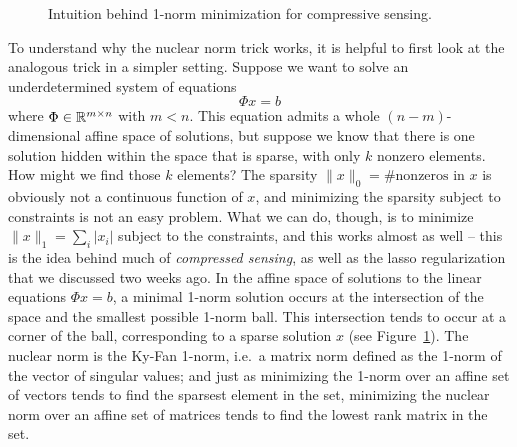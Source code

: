 \documentclass[12pt, leqno]{article} %
\begin{document}
\begin{figure}
  \begin{center}
  \end{center}
  \caption{Intuition behind 1-norm minimization for compressive
    sensing.}
  \label{fig:cs}
\end{figure}

To understand why the nuclear norm trick works, it is helpful to first
look at the analogous trick in a simpler setting.  Suppose we want to
solve an underdetermined system of equations
\[
  \Phi x = b
\]
where $\Phi \in \mathbb{R}^{m \times n}$ with $m < n$.  This equation admits
a whole $(n-m)$-dimensional affine space of solutions, but suppose we
know that there is one solution hidden within the space that is
sparse, with only $k$ nonzero elements.  How might we find those $k$
elements?  The sparsity $\|x\|_0 = \#\mbox{nonzeros in $x$}$ is
obviously not a continuous function of $x$, and minimizing the
sparsity subject to constraints is not an easy problem.  What we can
do, though, is to minimize $\|x\|_1 = \sum_i |x_i|$ subject to the
constraints, and this works almost as well -- this is the idea behind
much of {\em compressed sensing}, as well as the lasso regularization
that we discussed two weeks ago.  In the affine space of solutions to
the linear equations $\Phi x = b$, a minimal 1-norm solution occurs at
the intersection of the space and the smallest possible 1-norm ball.
This intersection tends to occur at a corner of the ball,
corresponding to a sparse solution $x$ (see Figure~\ref{fig:cs}).
The nuclear norm is the Ky-Fan 1-norm, i.e.~a matrix norm
defined as the 1-norm of the vector of singular values; and just as
minimizing the 1-norm over an affine set of vectors tends to
find the sparsest element in the set, minimizing the nuclear norm
over an affine set of matrices tends to find the lowest rank matrix
in the set.
\end{document}
